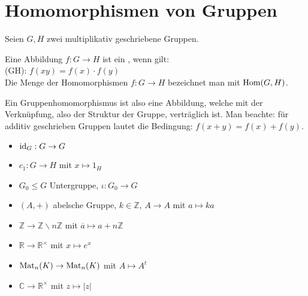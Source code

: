 \section{Homomorphismen von Gruppen}

Seien $G,H$ zwei multiplikativ geschriebene Gruppen.

\begin{definition}[Gruppenhomomorphismus]
	Eine Abbildung $f: G \to H$ ist ein , wenn gilt: \\
	(GH): $f(xy)=f(x)\cdot f(y)$ \\
	Die Menge der Homomorphismen $f:G\to H$ bezeichnet man mit $\operatorname{Hom}(G,H)$.
\end{definition}

\begin{remark}
	Ein Gruppenhomomorphismus ist also eine Abbildung, welche mit der Verknüpfung, also der Struktur 
	der Gruppe, verträglich ist. Man beachte: für additiv geschrieben Gruppen lautet die Bedingung: $f(x+y)=f(x)+f(y)$.
\end{remark}

\begin{example}
	\begin{itemize}
		\item $\operatorname{id}_G: G \to G$
		\item $c_1:G\to H$ mit $x\mapsto 1_H$
		\item $G_0\le G$ Untergruppe, $\iota:G_0\to G$
		\item $(A,+)$ abelsche Gruppe, $k\in \mathbb Z$, $A\to A$ mit $a\mapsto ka$
		\item $\mathbb Z \to \mathbb Z\backslash n\mathbb Z$ mit $\overline a \mapsto a+n\mathbb Z$
		\item $\mathbb R \to \mathbb R^{\times}$ mit $x\mapsto e^x$
		\item $\operatorname{Mat}_n(K)\to \operatorname{Mat}_n(K)$ mit $A\mapsto A^t$
		\item $\mathbb C\to \mathbb R^{\times}$ mit $z\mapsto |z|$
	\end{itemize}
\end{example}

